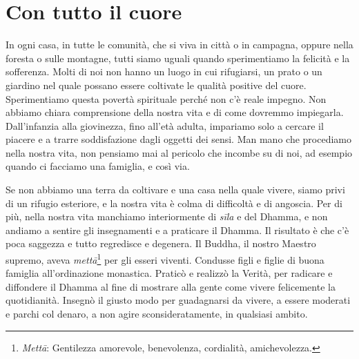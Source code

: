 \chapter{Con tutto il cuore}

In ogni casa, in tutte le comunità, che si viva in città o in campagna,
oppure nella foresta o sulle montagne, tutti siamo uguali quando
sperimentiamo la felicità e la sofferenza. Molti di noi non hanno un
luogo in cui rifugiarsi, un prato o un giardino nel quale possano essere
coltivate le qualità positive del cuore. Sperimentiamo questa povertà
spirituale perché non c'è reale impegno. Non abbiamo chiara comprensione
della nostra vita e di come dovremmo impiegarla. Dall'infanzia alla
giovinezza, fino all'età adulta, impariamo solo a cercare il piacere e a
trarre soddisfazione dagli oggetti dei sensi. Man mano che procediamo
nella nostra vita, non pensiamo mai al pericolo che incombe su di noi,
ad esempio quando ci facciamo una famiglia, e così via.

Se non abbiamo una terra da coltivare e una casa nella quale vivere,
siamo privi di un rifugio esteriore, e la nostra vita è colma di
difficoltà e di angoscia. Per di più, nella nostra vita manchiamo
interiormente di \emph{sīla} e del Dhamma, e non andiamo a sentire gli
insegnamenti e a praticare il Dhamma. Il risultato è che c'è poca
saggezza e tutto regredisce e degenera. Il Buddha, il nostro Maestro
supremo, aveva \emph{mettā}\footnote{\emph{Mettā}: Gentilezza amorevole,
  benevolenza, cordialità, amichevolezza.} per gli esseri viventi.
Condusse figli e figlie di buona famiglia all'ordinazione monastica.
Praticò e realizzò la Verità, per radicare e diffondere il Dhamma al
fine di mostrare alla gente come vivere felicemente la quotidianità.
Insegnò il giusto modo per guadagnarsi da vivere, a essere moderati e
parchi col denaro, a non agire sconsideratamente, in qualsiasi ambito.

